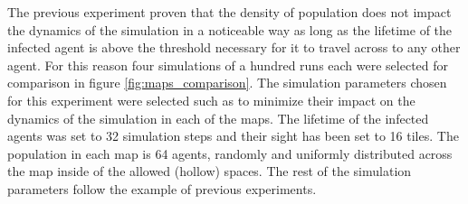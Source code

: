 


The previous experiment proven that the density of population does not impact the dynamics of the simulation in a noticeable way as long as the lifetime of the infected agent is above the threshold necessary for it to travel across to any other agent.
For this reason four simulations of a hundred runs each were selected for comparison in figure \ref{fig:maps_comparison}.
The simulation parameters chosen for this experiment were selected such as to minimize their impact on the dynamics of the simulation in each of the maps.
The lifetime of the infected agents was set to 32 simulation steps and their sight has been set to 16 tiles.
The population in each map is 64 agents, randomly and uniformly distributed across the map inside of the allowed (hollow) spaces.
The rest of the simulation parameters follow the example of previous experiments.

